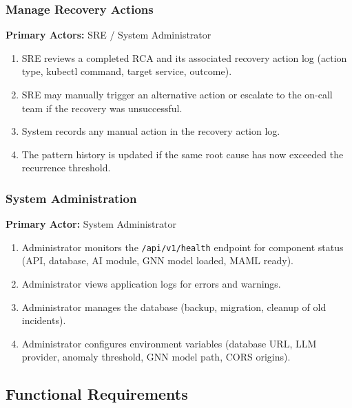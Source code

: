 \documentclass[11pt,a4paper]{article}
\begin{document}
\subsubsection{Manage Recovery Actions}

\textbf{Primary Actors:} SRE / System Administrator

\begin{enumerate}
    \item SRE reviews a completed RCA and its associated recovery action log (action type, kubectl command, target service, outcome).
    \item SRE may manually trigger an alternative action or escalate to the on-call team if the recovery was unsuccessful.
    \item System records any manual action in the recovery action log.
    \item The pattern history is updated if the same root cause has now exceeded the recurrence threshold.
\end{enumerate}

\subsubsection{System Administration}

\textbf{Primary Actor:} System Administrator

\begin{enumerate}
    \item Administrator monitors the \texttt{/api/v1/health} endpoint for component status (API, database, AI module, GNN model loaded, MAML ready).
    \item Administrator views application logs for errors and warnings.
    \item Administrator manages the database (backup, migration, cleanup of old incidents).
    \item Administrator configures environment variables (database URL, LLM provider, anomaly threshold, GNN model path, CORS origins).
\end{enumerate}


\subsection{Functional Requirements}
\end{document}
